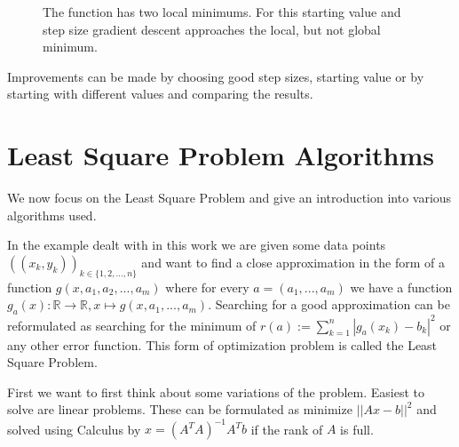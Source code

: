 \begin{figure}[h]
	\centering
	\caption{The function has two local minimums. For this starting value and step size gradient descent approaches the local, but not global minimum.}
	\label{fig:grad_descent_global_min_not_found}
\end{figure}

Improvements can be made by choosing good step sizes, starting value or by starting with different values and comparing the results.

\section{Least Square Problem Algorithms}


We now focus on the Least Square Problem and give an introduction into various algorithms used.

In the example dealt with in this work we are given some data points $((x_k, y_k))_{k \in \{1, 2, ..., n\}}$ and want to find a close approximation in the form of a function $g(x, a_1, a_2, ..., a_m)$ where for every $a = (a_1, ..., a_m)$ we have a function $g_a(x) : \mathbb{R} \rightarrow \mathbb{R}, x \mapsto g(x, a_1, ..., a_m)$. Searching for a good approximation can be reformulated as searching for the minimum of $r(a) := \sum_{k=1}^{n} |g_a(x_k) - b_k|^2$ or any other error function. This form of optimization problem is called the Least Square Problem.

First we want to first think about some variations of the problem. Easiest to solve are linear problems. These can be formulated as minimize $||Ax - b||^2$ and solved using Calculus by $x=(A^TA)^{-1}A^Tb$ if the rank of $A$ is full.

